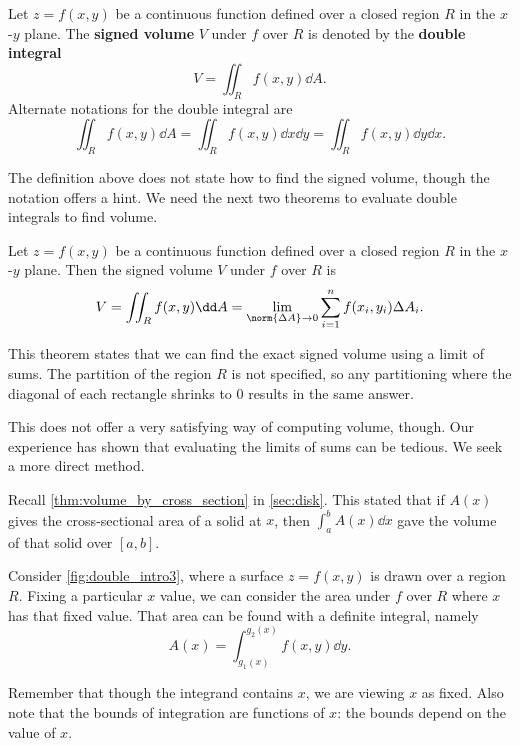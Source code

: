 \begin{definition}\label{def:double_int}
Let $z=f(x,y)$ be a continuous function defined over a closed region $R$ in the $x$-$y$ plane. The \textbf{signed volume} $V$ under $f$ over $R$ is denoted by the \textbf{double integral}\vspace{-.5\baselineskip}
\[V = \iint_R f(x,y)\dd A.\]
Alternate notations for the double integral are
\[\iint_R f(x,y)\dd A=\iint_R f(x,y)\dd x\dd y=\iint_R f(x,y)\dd y\dd x.\]
\end{definition}

The definition above does not state how to find the signed volume, though the notation offers a hint. We need the next two theorems to evaluate double integrals to find volume.

\begin{theorem}\label{thm:double_int}
Let $z=f(x,y)$ be a continuous function defined over a closed region $R$ in the $x$-$y$ plane. Then the signed volume $V$ under $f$ over $R$ is
\[V = \iint_R f(x,y)\dd A = \lim_{\norm{\Delta A}\to 0}\sum_{i=1}^n f(x_i,y_i)\Delta A_i.\]
\end{theorem}

This theorem states that we can find the exact signed volume using a limit of sums. The partition of the region $R$ is not specified, so any partitioning where the diagonal of each rectangle shrinks to 0 results in the same answer. 

This does not offer a very satisfying way of computing volume, though. Our experience has shown that evaluating the limits of sums can be tedious. We seek a more direct method.

Recall \autoref{thm:volume_by_cross_section} in \autoref{sec:disk}. This stated that if $A(x)$ gives the cross-sectional area of a solid at $x$, then $\int_a^b A(x)\dd x$ gave the volume of that solid over $[a,b]$. 

Consider \autoref{fig:double_intro3}, where a surface $z=f(x,y)$ is drawn over a region $R$. Fixing a particular $x$ value, we can consider the area under $f$ over $R$ where $x$ has that fixed value. That area can be found with a definite integral, namely
\[ A(x)=\int_{g_1(x)}^{g_2(x)} f(x,y)\dd y.\]

Remember that though the integrand contains $x$, we are viewing $x$ as fixed. Also note that the bounds of integration are functions of $x$: the bounds depend on the value of $x$. 

